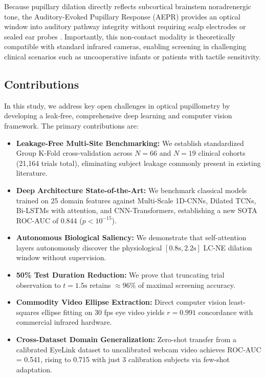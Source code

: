 \documentclass[journal]{IEEEtran}
\begin{document}
Because pupillary dilation directly reflects subcortical brainstem noradrenergic tone, the Auditory-Evoked Pupillary Response (AEPR) provides an optical window into auditory pathway integrity without requiring scalp electrodes or sealed ear probes \cite{nortmann2020screening}. Importantly, this non-contact modality is theoretically compatible with standard infrared cameras, enabling screening in challenging clinical scenarios such as uncooperative infants or patients with tactile sensitivity.

\subsection{Contributions}
In this study, we address key open challenges in optical pupillometry by developing a leak-free, comprehensive deep learning and computer vision framework. The primary contributions are:
\begin{itemize}
    \item \textbf{Leakage-Free Multi-Site Benchmarking:} We establish standardized Group K-Fold cross-validation across $N=66$ and $N=19$ clinical cohorts (21,164 trials total), eliminating subject leakage commonly present in existing literature.
    \item \textbf{Deep Architecture State-of-the-Art:} We benchmark classical models trained on 25 domain features against Multi-Scale 1D-CNNs, Dilated TCNs, Bi-LSTMs with attention, and CNN-Transformers, establishing a new SOTA ROC-AUC of 0.844 ($p < 10^{-15}$).
    \item \textbf{Autonomous Biological Saliency:} We demonstrate that self-attention layers autonomously discover the physiological $[0.8\text{s}, 2.2\text{s}]$ LC-NE dilation window without supervision.
    \item \textbf{50\% Test Duration Reduction:} We prove that truncating trial observation to $t = 1.5\text{s}$ retains ${\approx}96\%$ of maximal screening accuracy.
    \item \textbf{Commodity Video Ellipse Extraction:} Direct computer vision least-squares ellipse fitting on 30 fps eye video yields $r=0.991$ concordance with commercial infrared hardware.
    \item \textbf{Cross-Dataset Domain Generalization:} Zero-shot transfer from a calibrated EyeLink dataset to uncalibrated webcam video achieves ROC-AUC = 0.541, rising to 0.715 with just 3 calibration subjects via few-shot adaptation.
\end{itemize}
\end{document}
